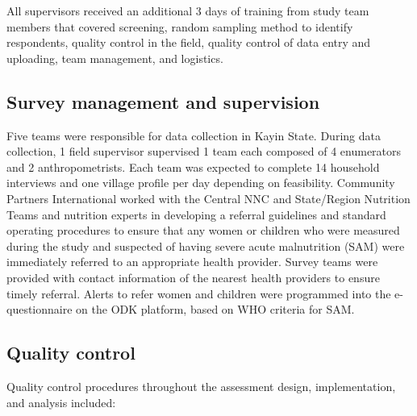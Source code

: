 \documentclass[12pt,a4paper]{article}
\begin{document}
All supervisors received an additional 3 days of training from study team members that covered screening, random sampling method to identify respondents, quality control in the field, quality control of data entry and uploading, team management, and logistics.

\hypertarget{survy-management}{%
\subsection{Survey management and supervision}\label{survy-management}}

Five teams were responsible for data collection in Kayin State. During data collection, 1 field supervisor supervised 1 team each composed of 4 enumerators and 2 anthropometrists. Each team was expected to complete 14 household interviews and one village profile per day depending on feasibility. Community Partners International worked with the Central NNC and State/Region Nutrition Teams and nutrition experts in developing a referral guidelines and standard operating procedures to ensure that any women or children who were measured during the study and suspected of having severe acute malnutrition (SAM) were immediately referred to an appropriate health provider. Survey teams were provided with contact information of the nearest health providers to ensure timely referral. Alerts to refer women and children were programmed into the e-questionnaire on the ODK platform, based on WHO criteria for SAM.

\hypertarget{quality-control}{%
\subsection{Quality control}\label{quality-control}}

Quality control procedures throughout the assessment design, implementation, and analysis included:
\end{document}
